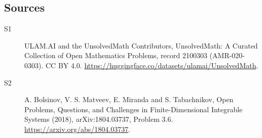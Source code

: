 \documentclass[11pt]{article}
\begin{document}
\subsection{Sources}
\begin{description}
\item[\hypertarget{source:2100303:1}{S1}] ULAM.AI and the UnsolvedMath Contributors, UnsolvedMath: A Curated Collection of Open Mathematics Problems, record 2100303 (AMR-020-0303). CC BY 4.0. \url{https://huggingface.co/datasets/ulamai/UnsolvedMath}.
\item[\hypertarget{source:2100303:2}{S2}] A. Bolsinov, V. S. Matveev, E. Miranda and S. Tabachnikov, Open Problems, Questions, and Challenges in Finite-Dimensional Integrable Systems (2018), arXiv:1804.03737, Problem 3.6. \url{https://arxiv.org/abs/1804.03737}.
\end{description}
\label{end:2100303}
\end{document}
